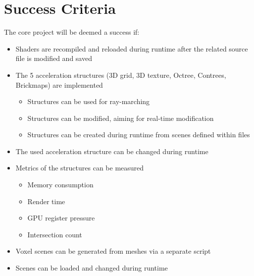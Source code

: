 \section*{Success Criteria}

The core project will be deemed a success if:
\begin{itemize}[noitemsep]
  \item Shaders are recompiled and reloaded during runtime after the
    related source file is modified and saved
  \item The 5 acceleration structures (3D grid, 3D texture, Octree,
    Contrees, Brickmaps) are implemented
    \begin{itemize}
      \item Structures can be used for ray-marching
      \item Structures can be modified, aiming for real-time modification
      \item Structures can be created during runtime from scenes
        defined within files
    \end{itemize}
  \item The used acceleration structure can be changed during runtime
  \item Metrics of the structures can be measured
    \begin{itemize}
      \item Memory consumption
      \item Render time
      \item GPU register pressure
      \item Intersection count
    \end{itemize}
  \item Voxel scenes can be generated from meshes via a separate script
  \item Scenes can be loaded and changed during runtime
\end{itemize}
